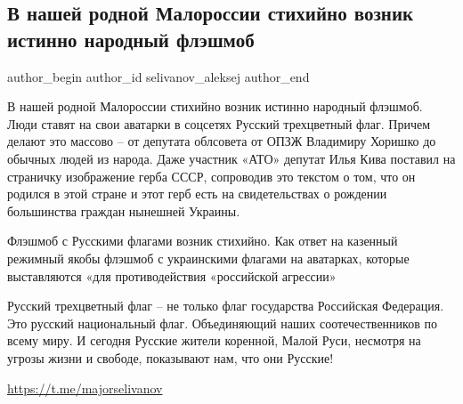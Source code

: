  
 
 
 
 
 
\subsection{В нашей родной Малороссии стихийно возник истинно народный флэшмоб}
\label{sec:28_01_2022.fb.selivanov_aleksej.1.malorossia_fleshmob}
 
\ifcmt
 author_begin
   author_id selivanov_aleksej
 author_end
\fi

В нашей родной Малороссии стихийно возник истинно народный флэшмоб. Люди ставят
на свои аватарки в соцсетях Русский трехцветный флаг. Причем делают это массово
– от депутата облсовета от ОПЗЖ Владимиру Хоришко до обычных людей из народа.
Даже участник «АТО» депутат Илья Кива поставил на страничку изображение герба
СССР, сопроводив это текстом о том, что он родился в этой стране и этот герб
есть на свидетельствах о рождении большинства граждан нынешней Украины. 


Флэшмоб с Русскими флагами возник стихийно. Как ответ на казенный режимный
якобы флэшмоб с украинскими флагами на аватарках, которые выставляются «для
противодействия «российской агрессии»

Русский трехцветный флаг – не только флаг государства Российская Федерация. Это
русский национальный флаг. Объединяющий наших соотечественников по всему миру.
И сегодня Русские жители коренной, Малой Руси, несмотря на угрозы жизни и
свободе, показывают нам, что они Русские! 

\url{https://t.me/majorselivanov}
